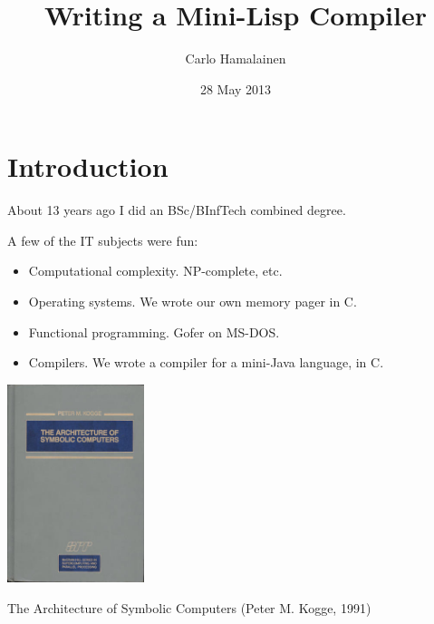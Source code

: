\documentclass[professionalFonts]{beamer}
\title[Writing a Mini-Lisp Compiler]{%
  Writing a Mini-Lisp Compiler
}
\author{Carlo Hamalainen}
\institute{carlo-hamalainen.net}
\date{28 May 2013}
\begin{document}
\begin{frame}
\titlepage
\end{frame}

\section{Introduction}

\begin{frame}

About 13 years ago I did an BSc/BInfTech combined degree.
\vspace{\baselineskip}

A few of the IT subjects were fun:
\vspace{\baselineskip}

\begin{itemize}

\item Computational complexity. NP-complete, etc.

\item Operating systems. We wrote our own memory pager in C.

\item Functional programming. Gofer on MS-DOS.

\item Compilers. We wrote a compiler for a mini-Java language, in C. 

\end{itemize}



\end{frame}

\begin{frame}

\begin{center}
\includegraphics[width=4cm]{kogge.jpg}
\end{center}

The Architecture of Symbolic Computers (Peter M. Kogge, 1991)

\end{frame}
\end{document}
